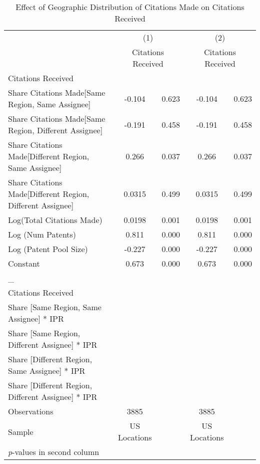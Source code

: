 {
\begin{longtable}{l*{2}{cc}}
\caption{Effect of Geographic Distribution of Citations Made on Citations Received \label{model25}}\\
\hline\hline\endfirsthead\hline\endhead\hline\endfoot\endlastfoot
                &\multicolumn{2}{c}{(1)}&\multicolumn{2}{c}{(2)}\\
                &\multicolumn{2}{c}{Citations Received}&\multicolumn{2}{c}{Citations Received}\\
\hline
Citations Received&         &         &         &         \\
Share Citations Made[Same Region, Same Assignee]&   -0.104&    0.623&   -0.104&    0.623\\
Share Citations Made[Same Region, Different Assignee]&   -0.191&    0.458&   -0.191&    0.458\\
Share Citations Made[Different Region, Same Assignee]&    0.266&    0.037&    0.266&    0.037\\
Share Citations Made[Different Region, Different Assignee]&   0.0315&    0.499&   0.0315&    0.499\\
Log(Total Citations Made)&   0.0198&    0.001&   0.0198&    0.001\\
Log (Num Patents)&    0.811&    0.000&    0.811&    0.000\\
Log (Patent Pool Size)&   -0.227&    0.000&   -0.227&    0.000\\
Constant        &    0.673&    0.000&    0.673&    0.000\\
\hline
\_               &         &         &         &         \\
Citations Received&         &         &         &         \\
Share [Same Region, Same Assignee] * IPR&         &         &         &         \\
Share [Same Region, Different Assignee] * IPR&         &         &         &         \\
Share [Different Region, Same Assignee] * IPR&         &         &         &         \\
Share [Different Region, Different Assignee] * IPR&         &         &         &         \\
\hline
Observations    &     3885&         &     3885&         \\
Sample          &US Locations&         &US Locations&         \\
\hline\hline
\multicolumn{5}{l}{\footnotesize \textit{p}-values in second column}\\
\end{longtable}
}
